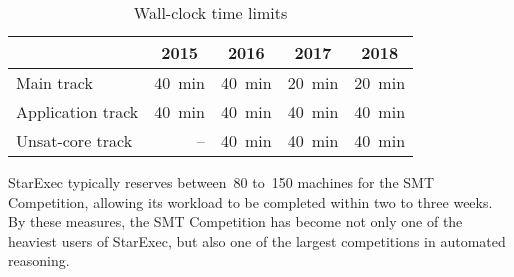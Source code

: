 \documentclass[twoside,11pt]{article}
\begin{document}
\begin{table}
  \caption{Wall-clock time limits}
  \label{table:time-limits}
  \centering
  \begin{tabular}{|l|r|r|r|r|}
    \hline
    & \multicolumn{1}{c|}{2015} & \multicolumn{1}{c|}{2016} & \multicolumn{1}{c|}{2017} & \multicolumn{1}{c|}{2018} \\
    \hline
    Main track        & 40~min & 40~min & 20~min\protect\footnotemark & 20~min \\
    Application track & 40~min & 40~min & 40~min\phantom{$^{1.}$} & 40~min \\
    Unsat-core track  &     -- & 40~min & 40~min\phantom{$^{1.}$} & 40~min \\
    \hline
  \end{tabular}
\end{table}

StarExec typically reserves between~80 to~150 machines for the SMT
Competition, allowing its workload to be completed within two to three
weeks.  By these measures, the SMT Competition has become not only one
of the heaviest users of StarExec, but also one of the largest
competitions in automated reasoning.
\end{document}
